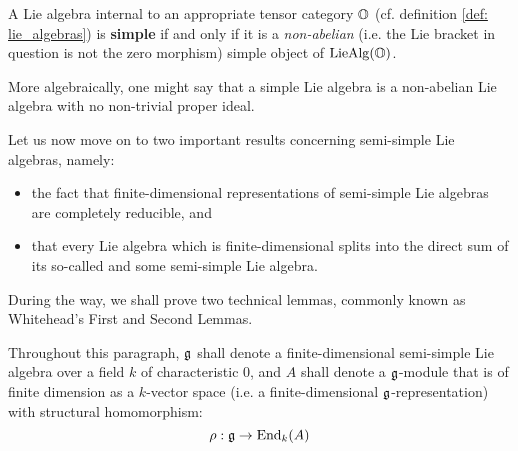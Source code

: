                     \begin{definition} \label{def: simple_lie_algebras}
                        A Lie algebra internal to an appropriate tensor category $\mathbb{O}$ (cf. definition \ref{def: lie_algebras}) is \textbf{simple} if and only if it is a \textit{non-abelian} (i.e. the Lie bracket in question is not the zero morphism) simple object of $\mathrm{Lie}\mathrm{Alg}(\mathbb{O})$.
                        
                        More algebraically, one might say that a simple Lie algebra is a non-abelian Lie algebra with no non-trivial proper ideal.
                    \end{definition}
                
                    Let us now move on to two important results concerning semi-simple Lie algebras, namely:
                        \begin{itemize}
                            \item the fact that finite-dimensional representations of semi-simple Lie algebras are completely reducible, and
                            \item that every Lie algebra which is finite-dimensional splits into the direct sum of its so-called  and some semi-simple Lie algebra. 
                        \end{itemize}
                    During the way, we shall prove two technical lemmas, commonly known as Whitehead's First and Second Lemmas.
                    
                    \begin{convention} \label{conv: cohomology_of_semi_simple_lie_algebras_conventions}
                        Throughout this paragraph, $\mathfrak{g}$ shall denote a finite-dimensional semi-simple Lie algebra over a field $k$ of characteristic $0$, and $A$ shall denote a $\mathfrak{g}$-module that is of finite dimension as a $k$-vector space (i.e. a finite-dimensional $\mathfrak{g}$-representation) with structural homomorphism:
                            $$\rho: \mathfrak{g} \to \mathrm{End}_k(A)$$
                    \end{convention}
                    
